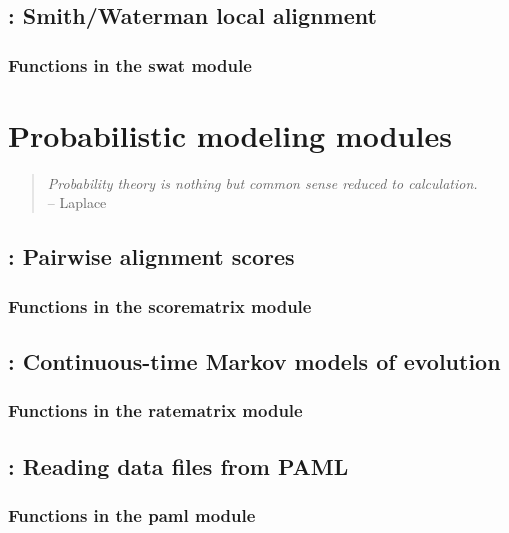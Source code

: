 \documentclass[10pt]{book}
\begin{document}
\newpage
\section{: Smith/Waterman local alignment}

\subsection{Functions in the swat module}




\chapter{Probabilistic modeling modules}
\begin{quote}
  \emph{Probability theory is nothing but common sense reduced to
  calculation.}\\
\hspace*{1em}\hfill -- Laplace
\end{quote}

\newpage
\section{: Pairwise alignment scores}

\subsection{Functions in the scorematrix module}


\newpage
\section{: Continuous-time Markov models of evolution}

\subsection{Functions in the ratematrix module}


\newpage
\section{: Reading data files from PAML}

\subsection{Functions in the paml module}

\end{document}
